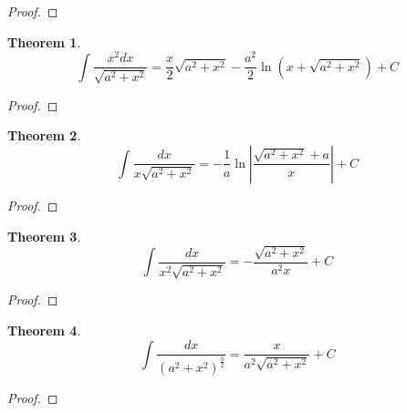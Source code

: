 \documentclass[10pt]{report}
\newtheorem{thm3}{Theorem}[subsection]
\begin{document}
\begin{proof}

\end{proof}
\begin{thm3}
$$\int \frac{x^2dx}{\sqrt{a^2 + x^2}}=\frac{x}{2}\sqrt{a^2 + x^2}-\frac{a^2}{2}\ln (x+\sqrt{a^2 + x^2})+C$$
\end{thm3}
\begin{proof}

\end{proof}
\begin{thm3}
$$\int \frac{dx}{x\sqrt{a^2 + x^2}} = -\frac{1}{a}\ln\left |\frac{\sqrt{a^2 + x^2} + a}{x}\right | +C$$
\end{thm3}
\begin{proof}

\end{proof}
\begin{thm3}
$$\int \frac{dx}{x^2\sqrt{a^2 + x^2}} = -\frac{\sqrt{a^2 + x^2}}{a^2x}+C$$
\end{thm3}
\begin{proof}

\end{proof}
\begin{thm3}
$$\int \frac{dx}{(a^2 + x^2)^{\frac{3}{2}}} = \frac{x}{a^2\sqrt{a^2 + x^2}}+C$$
\end{thm3}
\begin{proof}

\end{proof}
\end{document}

